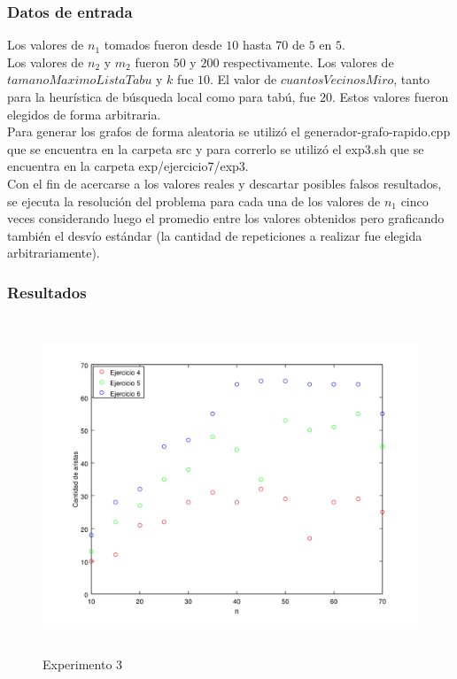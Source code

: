 \subsubsection*{Datos de entrada}\;
\noindent Los valores de $n_1$ tomados fueron desde $10$ hasta $70$ de $5$ en $5$. \\
       Los valores de $n_2$ y $m_2$ fueron $50$ y $200$ respectivamente. Los valores de $tamanoMaximoListaTabu$ y $k$ fue $10$. El valor de $cuantosVecinosMiro$, tanto para la heurística de búsqueda local como para tabú, fue $20$. Estos valores fueron elegidos de forma arbitraria. \\
        Para generar los grafos de forma aleatoria se utilizó el generador-grafo-rapido.cpp que se encuentra en la carpeta src y para correrlo se utilizó el exp3.sh que se encuentra en la carpeta exp/ejercicio7/exp3. \\
        Con el fin de acercarse a los valores reales y descartar posibles falsos resultados, se ejecuta la resolución del problema para cada una de los valores de $n_1$ cinco veces considerando luego el promedio entre los valores obtenidos pero graficando también el desvío estándar (la cantidad de repeticiones a realizar fue elegida arbitrariamente).\; 
\subsubsection*{Resultados}\;
  \begin{figure}[H]
      \includegraphics[height=10cm]{graficos/ejercicio7-exp3-aristas.png}
       \caption{Experimento 3}
	\end{figure}
    
